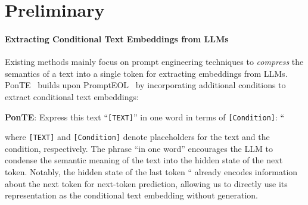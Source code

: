 \documentclass[11pt]{article}
\begin{document}
\section{Preliminary}
\paragraph{Extracting Conditional Text Embeddings from LLMs}
Existing methods mainly focus on prompt engineering techniques to \textit{compress} the semantics of a text into a single token for extracting embeddings from LLMs.
PonTE~\cite{ponte} builds upon PromptEOL~\cite{prompteol} by incorporating additional conditions to extract conditional text embeddings:
\begin{tcolorbox}
\textbf{PonTE}: Express this text ``\texttt{[TEXT]}'' in one word in terms of \texttt{[Condition]}: ``
\end{tcolorbox} 
where \texttt{[TEXT]} and \texttt{[Condition]} denote placeholders for the text and the condition, respectively.
The phrase ``in one word'' encourages the LLM to condense the semantic meaning of the text into the hidden state of the next token.
Notably, the hidden state of the last token `` already encodes information about the next token for next-token prediction, allowing us to directly use its representation as the conditional text embedding without generation.

\end{document}
